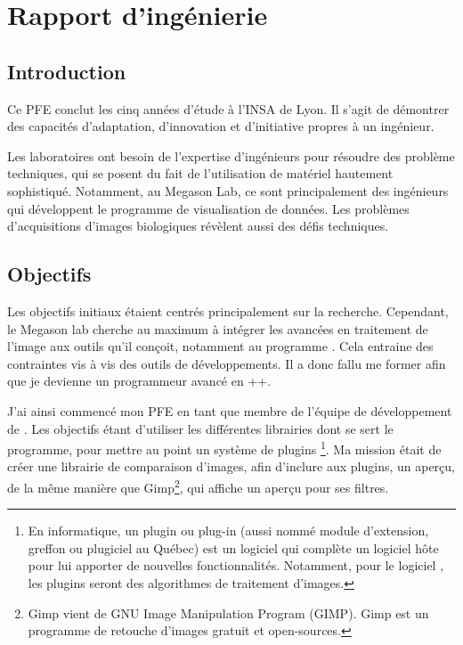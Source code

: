 

\chapter{Rapport d'ingénierie} 


\section*{Introduction}
Ce PFE conclut les cinq années d'étude à l'INSA de Lyon. 
Il s'agit de démontrer des capacités d'adaptation,
d'innovation et d'initiative propres à un ingénieur.

Les laboratoires ont besoin de l'expertise d'ingénieurs
pour résoudre des problème techniques, qui se posent du fait de l'utilisation de matériel hautement sophistiqué.
Notamment, au Megason Lab, ce sont principalement des ingénieurs qui développent le programme de visualisation de données. 
Les problèmes d'acquisitions d'images biologiques révèlent aussi des défis techniques.
 
\section*{Objectifs}

Les objectifs initiaux étaient centrés principalement sur la recherche.
Cependant, le Megason lab cherche au maximum à intégrer les avancées en traitement de l'image aux outils qu'il conçoit,
 notamment au programme \gofigure. Cela entraine des contraintes vis à vis des outils de développements. 
 Il a donc fallu me former afin que je devienne un programmeur avancé en {\C++}. 
 
J'ai ainsi commencé mon PFE en tant que membre de l'équipe de développement de {\gofigure}.
 Les objectifs étant d'utiliser les différentes librairies dont se sert le programme, pour mettre au point un système de plugins
 \footnote{En informatique, un plugin ou plug-in (aussi nommé module d'extension, greffon ou plugiciel au Québec) est un logiciel qui complète un logiciel hôte pour lui apporter de nouvelles fonctionnalités. Notamment, pour le logiciel \gofigure, les plugins seront des algorithmes de traitement d'images.}. 
 Ma mission était de créer une librairie de comparaison d'images, afin d'inclure aux plugins, un aperçu, de la même manière que Gimp\footnote{Gimp vient de GNU Image Manipulation Program (GIMP). Gimp est un programme de retouche d'images gratuit et open-sources.
 }, qui affiche un aperçu pour ses filtres.


